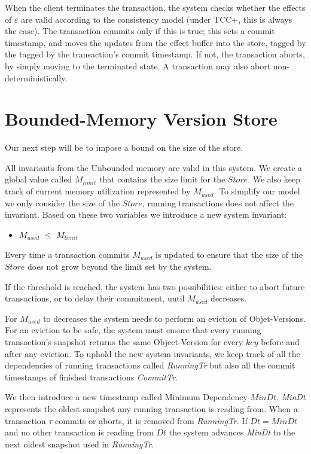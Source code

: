\documentclass[systeme,french,english]{compas2022}
\newcommand{\commentaire}[2][fromWhom?]{%
  {%
    \color{magenta}{\bfseries\sffamily\scriptsize$\triangleright$(#1:) #2$\triangleleft$}%
  }}
\begin{document}
When the client terminates the transaction, the system checks whether
the effects of $\varepsilon$ are valid according to the consistency model
(under TCC+, this is always the case).
The transaction commits only if this is true; this sets a commit
timestamp, and moves the updates
from the effect buffer into the store, tagged by the tagged by the transaction's commit timestamp.
If not, the transaction aborts, by simply moving to the terminated
state.
A transaction may also abort non-deterministically.

\section{Bounded-Memory Version Store}

Our next step will be to impose a bound on the size of the store.

All invariants from the Unbounded memory are valid in this system.
We create a global value called $\mathit{M_{limit}}$ that contains the size 
limit for the $\mathit{Store}$.
We also keep track of current memory utilization represented by $\mathit{M_{used}}$.
To simplify our model we only consider the size of the $\mathit{Store}$, running transactions does not affect the invariant.
Based on these two variables we introduce a new system invariant:
\begin{itemize}
  \item \emph{$M_{used}$} $\leq$ \emph{$M_{limit}$}
\end{itemize}

Every time a transaction commits $\mathit{M_{used}}$ is updated to ensure that the size of the $\mathit{Store}$ does not grow beyond the limit set by the system.

If the threshold is reached, the system has two possibilities: either to abort future transactions, or to delay their commitment, until $\mathit{M_{used}}$ decreases. 

For $\mathit{M_{used}}$ to decreases the system needs to perform an eviction of Objet-Versions.
For an eviction to be safe, the system must ensure that every running transaction's snapshot returns the same Object-Version for every $\mathit{key}$ before and after any eviction.
To uphold the new system invariants, we keep track of all the dependencies of running transactions called \emph{RunningTr} but also all the commit timestamps of finished transactions \emph{CommitTr}.

We then introduce a new timestamp called Minimum Dependency $\mathit{MinDt}$.
\emph{MinDt} represents the oldest snapshot any running transaction is reading from.
When a transaction $\tau$ commits or aborts, it is removed from \emph{RunningTr}. 
If $\mathit{Dt= MinDt}$ and no other transaction is reading from $\mathit{Dt}$ the system advances \emph{MinDt} to the next oldest snapshot used in \emph{RunningTr}.
\end{document}
